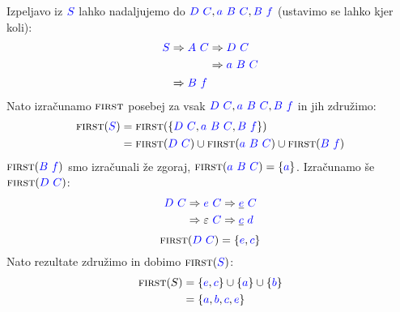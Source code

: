 \documentclass{article}
\newcommand{\FIRST}{\textsc{first}}
\newcommand{\Symbol}[1]{\textcolor{blue}{#1}}
\newcommand{\Null}{\varepsilon}
\newcommand{\Derive}{\Rightarrow}
\newcommand{\Seq}{\ }
\begin{document}
  Izpeljavo iz $\Symbol{S}$ lahko nadaljujemo do $\Symbol{D} \Seq \Symbol{C}, \Symbol{a} \Seq \Symbol{B} \Seq \Symbol{C}, \Symbol{B} \Seq \Symbol{f}$ (ustavimo se lahko kjer koli):
  \begin{equation*}
    \Symbol{S} \begin{aligned}[t]
      &\Derive \Symbol{A} \Seq \Symbol{C} \begin{aligned}[t]
        &\Derive \Symbol{D} \Seq \Symbol{C}\\
        &\Derive \Symbol{a} \Seq \Symbol{B} \Seq \Symbol{C}
      \end{aligned}\\
      &\Derive \Symbol{B} \Seq \Symbol{f}
    \end{aligned}
  \end{equation*}
  Nato izračunamo $\FIRST$ posebej za vsak $\Symbol{D} \Seq \Symbol{C}, \Symbol{a} \Seq \Symbol{B} \Seq \Symbol{C}, \Symbol{B} \Seq \Symbol{f}$ in jih združimo:
  \begin{align*}
    \FIRST(\Symbol{S}) &= \FIRST(\{\Symbol{D} \Seq \Symbol{C}, \Symbol{a} \Seq \Symbol{B} \Seq \Symbol{C}, \Symbol{B} \Seq \Symbol{f}\}) \\
              &= \FIRST(\Symbol{D} \Seq \Symbol{C}) \cup \FIRST(\Symbol{a} \Seq \Symbol{B} \Seq \Symbol{C}) \cup \FIRST(\Symbol{B} \Seq \Symbol{f})
  \end{align*}
  $\FIRST(\Symbol{B} \Seq \Symbol{f})$ smo izračunali že zgoraj, $\FIRST(\Symbol{a} \Seq \Symbol{B} \Seq \Symbol{C}) = \{\Symbol{a}\}$.
  Izračunamo še $\FIRST(\Symbol{D} \Seq \Symbol{C})$:
  \begin{equation*}
    \Symbol{D} \Seq \Symbol{C} \begin{aligned}[t]
      &\Derive \Symbol{e} \Seq \Symbol{C} \Derive \underline{\Symbol{e}} \Seq \Symbol{C} \\
      &\Derive \Null \Seq \Symbol{C} \Derive \underline{\Symbol{c}} \Seq \Symbol{d} \\
    \end{aligned}
  \end{equation*}
  \begin{equation*}
    \FIRST(\Symbol{D} \Seq \Symbol{C}) = \{\Symbol{e}, \Symbol{c}\}
  \end{equation*}
  Nato rezultate združimo in dobimo $\FIRST(\Symbol{S})$:
  \begin{align*}
    \FIRST(S) &= \{\Symbol{e}, \Symbol{c}\} \cup \{\Symbol{a}\} \cup \{\Symbol{b}\} \\
              &= \{\Symbol{a}, \Symbol{b}, \Symbol{c}, \Symbol{e}\}
  \end{align*}
\end{document}
